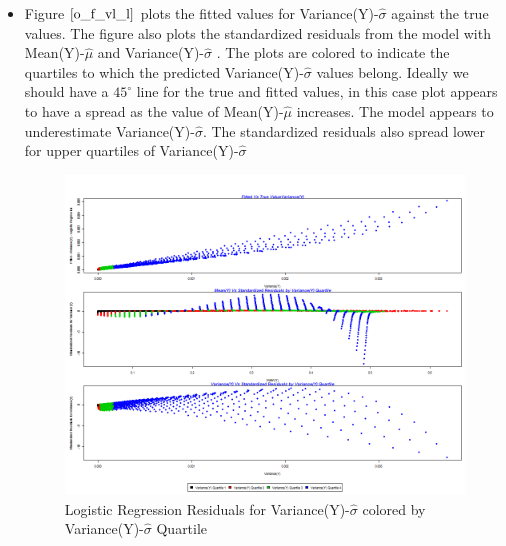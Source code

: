 \documentclass[twoside,12pt]{article}
\begin{document}
\begin{itemize}
\FloatBarrier
\item
Figure $\eqref{o_f_vl_l}$ plots the fitted values for Variance(Y)-$\hat{\sigma}$ against the true values. The figure also plots the standardized residuals from the model with Mean(Y)-$\hat{\mu}$  and Variance(Y)-$\hat{\sigma}$ . The plots are colored to indicate the quartiles to which the predicted Variance(Y)-$\hat{\sigma}$ values belong. Ideally we should have a $45^{\circ}$ line for the true and fitted values, in this case plot appears to have a spread as the value of Mean(Y)-$\hat{\mu}$ increases. The model appears to underestimate Variance(Y)-$\hat{\sigma}$. The standardized residuals also spread lower for upper quartiles of Variance(Y)-$\hat{\sigma}$ 
\FloatBarrier
\begin{figure}[!htbp]
\centering
\includegraphics[scale=.50]{images/mt_rse_plot_v_trg_lr.png} 
\caption{Logistic Regression Residuals for Variance(Y)-$\hat{\sigma}$ colored by Variance(Y)-$\hat{\sigma}$ Quartile}
\label{o_f_vl_l}
\end{figure}


\end{itemize}


\FloatBarrier
\end{document}

